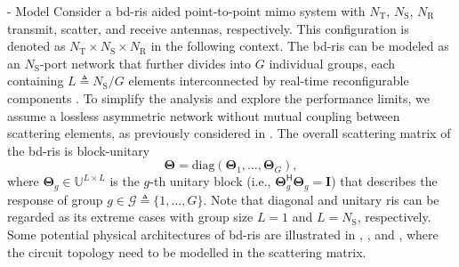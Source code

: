 \documentclass[journal]{IEEEtran}
\begin{document}
\begin{section}{- Model}
	Consider a \gls{bd}-\gls{ris} aided point-to-point \gls{mimo} system with $N_\mathrm{T}$, $N_\mathrm{S}$, $N_\mathrm{R}$ transmit, scatter, and receive antennas, respectively.
	This configuration is denoted as $N_\mathrm{T} \times N_\mathrm{S} \times N_\mathrm{R}$ in the following context.
	The \gls{bd}-\gls{ris} can be modeled as an $N_\mathrm{S}$-port network \cite{Ivrlac2010} that further divides into $G$ individual groups, each containing $L \triangleq N_\mathrm{S} / G$ elements interconnected by real-time reconfigurable components \cite{Shen2020a}.
	To simplify the analysis and explore the performance limits, we assume a lossless asymmetric network without mutual coupling between scattering elements, as previously considered in \cite{Li2023b,Li2023c,Bartoli2023}.
	The overall scattering matrix of the \gls{bd}-\gls{ris} is block-unitary
	\begin{equation}
		\mathbf{\Theta} = \mathrm{diag}(\mathbf{\Theta}_1,\ldots,\mathbf{\Theta}_G),
		\label{eq:bd_ris}
	\end{equation}
	where $\mathbf{\Theta}_g \in \mathbb{U}^{L \times L}$ is the $g$-th unitary block (i.e., $\mathbf{\Theta}_g^\mathsf{H} \mathbf{\Theta}_g = \mathbf{I}$) that describes the response of group $g \in \mathcal{G} \triangleq \{1, \ldots, G\}$.
	Note that diagonal and unitary \gls{ris} can be regarded as its extreme cases with group size $L=1$ and $L=N_\mathrm{S}$, respectively.
	Some potential physical architectures of \gls{bd}-\gls{ris} are illustrated in \cite[Fig. 3]{Shen2020a}, \cite[Fig. 5]{Li2023c}, and \cite[Fig. 2]{Nerini2024}, where the
	circuit topology need to be modelled in the scattering matrix.


\end{section}
\end{document}
